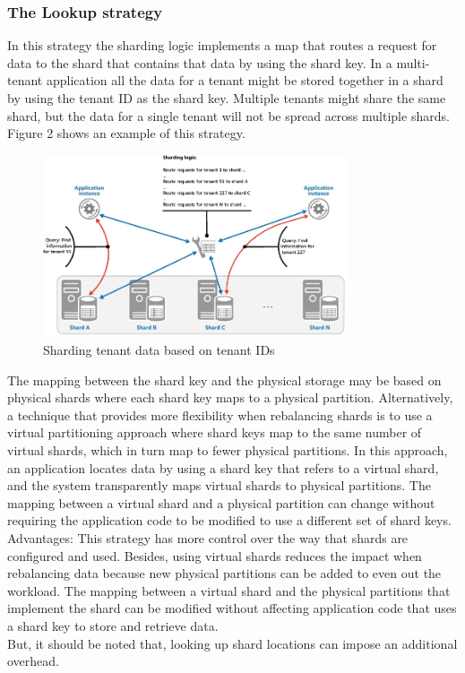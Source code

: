 \documentclass[10pt, conference]{IEEEtran}
\begin{document}
\subsubsection{The Lookup strategy}
\indent  In this strategy the sharding logic implements a map that routes a request for data to the shard that contains that data by using the shard key. In a multi-tenant application all the data for a tenant might be stored together in a shard by using the tenant ID as the shard key. Multiple tenants might share the same shard, but the data for a single tenant will not be spread across multiple shards. Figure 2 shows an example of this strategy. \\
\begin{figure}[h!]
	\centering
	\includegraphics[width=9cm]{figure2.jpg}
	\caption{Sharding tenant data based on tenant IDs \cite{ref3}}
\end{figure} 
\indent The mapping between the shard key and the physical storage may be based on physical shards where each shard key maps to a physical partition. Alternatively, a technique that provides more flexibility when rebalancing shards is to use a virtual partitioning approach where shard keys map to the same number of virtual shards, which in turn map to fewer physical partitions. In this approach, an application locates data by using a shard key that refers to a virtual shard, and the system transparently maps virtual shards to physical partitions. The mapping between a virtual shard and a physical partition can change without requiring the application code to be modified to use a different set of shard keys.\\
\indent Advantages: This strategy has more control over the way that shards are configured and used. Besides, using virtual shards reduces the impact when rebalancing data because new physical partitions can be added to even out the workload. The mapping between a virtual shard and the physical partitions that implement the shard can be modified without affecting application code that uses a shard key to store and retrieve data.\\
\indent But, it should be noted that, looking up shard locations can impose an additional overhead.
\end{document}
